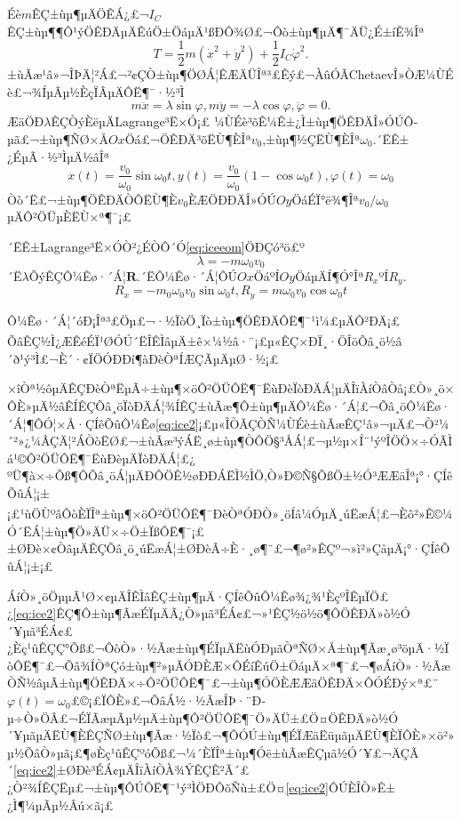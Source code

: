 \documentclass[A4,twoside]{ctexart}
\newcommand{\supercite}[1]{\textsuperscript{\cite{#1}}}
\begin{document}
Éè$m$ÊÇ±ùµ¶µÄÖÊÁ¿£¬$I_C$ÊÇ±ùµ¶¶Ô¹ýÖÊÐÄµÄÊúÖ±ÖáµÄ¹ßÐÔ¾Ø£¬Ôò±ùµ¶µÄ¶¯ÄÜ¿É±íÊ¾Îª
\begin{equation}
  \label{eq:ice3}
  T = \frac{1}{2}m\left(\dot{x}^2+\dot{y}^2\right)+\frac{1}{2}I_C\dot{\varphi}^2.
\end{equation}
±ùÃæ¹â»¬ÎÞÄ¦²Á£¬²¢ÇÒ±ùµ¶ÖØÁ¦ÊÆÄÜÎª³£Êý£¬ÀûÓÃChetaevÎ»ÒÆ¼ÙÉè£¬¾ÍµÃµ½ÈçÏÂµÄÔË¶¯·½³Ì
\begin{equation}
  \label{eq:iceeom}
  m \ddot{x} = \lambda \sin\varphi, m \ddot{y} = -\lambda \cos\varphi, \ddot{\varphi} = 0.
\end{equation}
ÆäÖÐ$\lambda$ÊÇÒýÈëµÄLagrange³Ë×Ó¡£
¼ÙÉè³õÊ¼Ê±¿Ì±ùµ¶ÖÊÐÄÎ»ÓÚÔ­µã£¬±ùµ¶ÑØ×Å$Ox$Öá£¬ÖÊÐÄ³õËÙ¶ÈÎª$v_0$,±ùµ¶½ÇËÙ¶ÈÎª$\omega_0$.´ËÊ±¿ÉµÃ·½³ÌµÄ½âÎª
\begin{equation}
  \label{eq:icesol}
  x(t) = \frac{v_0}{\omega_0}\sin\omega_0t, y(t) = \frac{v_0}{\omega_0}(1 - \cos\omega_0t), \varphi(t) = \omega_0
\end{equation}
Òò´Ë£¬±ùµ¶ÖÊÐÄÒÔËÙ¶È$v_0$ÈÆÖÐÐÄÎ»ÓÚ$Oy$ÖáÉÏ°ë¾¶Îª$v_0/\omega_0$µÄÔ²ÖÜµÈËÙ×ª¶¯¡£

´ËÊ±Lagrange³Ë×ÓÒ²¿ÉÒÔ´Ó\eqref{eq:iceeom}ÖÐÇó³ö£º
\begin{equation}
  \label{eq:icel}
 \lambda = -m\omega_0v_0
\end{equation}
´Ë$\lambda$ÕýÊÇÔ¼Êø·´Á¦$\mathbf{R}$.´ËÔ¼Êø·´Á¦ÔÚ$Ox$ÖáºÍ$Oy$ÖáµÄÍ¶Ó°Îª$R_x$ºÍ$R_y$.
\begin{equation}
  \label{eq:icecon}
  R_x = -m_0\omega_0v_0\sin\omega_0t, R_y = m \omega_0v_0\cos\omega_0t
\end{equation}

Ô¼Êø·´Á¦´óÐ¡Îª³£Öµ£¬·½ÏòÖ¸Ïò±ùµ¶ÖÊÐÄÔË¶¯¹ì¼£µÄÔ²ÐÄ¡£
ÕâÊÇ½Ì¿ÆÊéÉÏ¹ØÓÚ´ËÎÊÌâµÄ±ê×¼½â·¨\supercite{9,10}¡£µ«ÊÇ×ÐÏ¸·ÖÎöÕâ¸ö½â´ð¹ý³Ì£¬È´·¢ÏÖÓÐÐí¶àÐèÒªÍÆÇÃµÄµØ·½¡£

×îÒª½ôµÄÊÇÐèÒªËµÃ÷±ùµ¶×öÔ²ÖÜÔË¶¯ËùÐèÏòÐÄÁ¦µÄÎïÀíÒâÒå¡£Ò»¸ö×ÔÈ»µÄ½âÊÍÊÇÕâ¸öÏòÐÄÁ¦¾ÍÊÇ±ùÃæ¶Ô±ùµ¶µÄÔ¼Êø·´Á¦£¬Õâ¸öÔ¼Êø·´Á¦¶ÔÓ¦×Å·ÇÍêÕûÔ¼Êø\eqref{eq:ice2}¡£µ«ÎÒÃÇÒÑ¼ÙÉè±ùÃæÊÇ¹â»¬µÄ£¬Ò²¼´²»¿¼ÂÇÄ¦²ÁÒòËØ£¬±ùÃæ³ýÁË¸ø±ùµ¶ÒÔÖ§³ÅÁ¦£¬µ½µ×Í¨¹ýºÎÖÖ×÷ÓÃÌá¹©Ô²ÖÜÔË¶¯ËùÐèµÄÏòÐÄÁ¦£¿
ºÜ¶à×÷Õß¶ÔÕâ¸öÁ¦µÄÐÔÖÊ½øÐÐÁËÌ½ÌÖ,Ò»Ð©Ñ§ÕßÖ±½Ó³ÆÆäÎª¡°·ÇÍêÕûÁ¦¡±¡£¹ùÖÙºâ\supercite{6}ÔòÈÏÎª±ùµ¶×öÔ²ÖÜÔË¶¯ÐèÒªÓÐÒ»¸öÍâ¼ÓµÄ¸úËæÁ¦£¬Èô²»Ê©¼Ó´ËÁ¦±ùµ¶Ö»ÄÜ×÷Ö±ÏßÔË¶¯¡£±ØÐè×¢ÒâµÄÊÇÕâ¸ö¸úËæÁ¦±ØÐèÃ÷È·¸ø¶¨£¬¶ø²»ÊÇº¬»ì²»ÇåµÄ¡°·ÇÍêÕûÁ¦¡±¡£

ÁíÒ»¸öÖµµÃ¹Ø×¢µÄÎÊÌâÊÇ±ùµ¶µÄ·ÇÍêÕûÔ¼Êø¾¿¾¹ÈçºÎÊµÏÖ£¿\eqref{eq:ice2}ÊÇ¶Ô±ùµ¶ÃæÉÏµÄÃ¿Ò»µã³ÉÁ¢£¬»¹ÊÇ½ö½ö¶ÔÖÊÐÄ»ò½Ó´¥µã³ÉÁ¢£¿Èç¹ûÊÇÇ°Õß£¬ÔòÒ»·½Ãæ±ùµ¶ÉÏµÄËùÓÐµãÒªÑØ×Å±ùµ¶Ãæ¸ø³öµÄ·½ÏòÔË¶¯£¬Õâ¾ÍÒªÇó±ùµ¶²»µÃÓÐÈÆ×ÔÉíÊúÖ±ÖáµÄ×ª¶¯£¬¶øÁíÒ»·½ÃæÒÑ½âµÃ±ùµ¶ÖÊÐÄ×÷Ô²ÖÜÔË¶¯£¬±ùµ¶ÓÖÈÆÆäÖÊÐÄ×ÔÓÉÐý×ª£¨$\varphi(t)=\omega_0$£©¡£ÏÔÈ»£¬ÕâÁ½·½ÃæÎÞ·¨Ð­µ÷Ò»ÖÂ£¬ÉÏÃæµÃµ½µÄ±ùµ¶Ô²ÖÜÔË¶¯Ö»ÄÜ±£Ö¤ÖÊÐÄ»ò½Ó´¥µãµÄËÙ¶ÈÊÇÑØ±ùµ¶Ãæ·½Ïò£¬¶ÔÓÚ±ùµ¶ÉÏÆäËüµãµÄËÙ¶ÈÏÔÈ»×ö²»µ½ÕâÒ»µã¡£¶øÈç¹ûÊÇºóÕß£¬¼´ÈÏÎª±ùµ¶Óë±ùÃæÊÇµã½Ó´¥£¬ÄÇÃ´\eqref{eq:ice2}±ØÐè³ÉÁ¢µÄÎïÀíÒÀ¾ÝÊÇÊ²Ã´£¿Ò²¾ÍÊÇËµ£¬±ùµ¶ÔÚÔË¶¯¹ý³ÌÖÐÔõÑù±£Ö¤\eqref{eq:ice2}ÔÚÈÎÒ»Ê±¿Ì¶¼µÃµ½Âú×ã¡£
\end{document}
